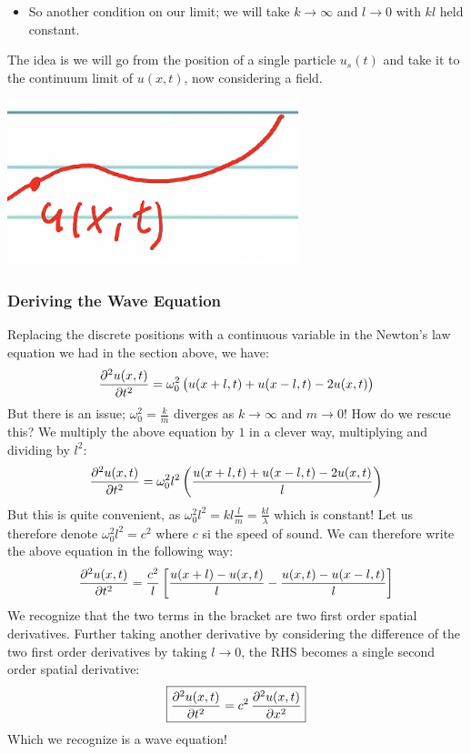 \documentclass[../PHYS306Notes.tex]{subfiles}
\begin{document}
\begin{itemize}
    \item So another condition on our limit; we will take $k \rightarrow \infty$ and $l \rightarrow 0$ with $kl$ held constant.
\end{itemize}
The idea is we will go from the position of a single particle $u_s(t)$ and take it to the continuum limit of $u(x, t)$, now considering a field.
\begin{center}
    \includegraphics[scale=1]{Lecture-30/l30-img2.png}
\end{center}

\subsubsection{Deriving the Wave Equation}
Replacing the discrete positions with a continuous variable in the Newton's law equation we had in the section above, we have:
\[\dpd[2]{u(x, t)}{t} = \omega_0^2\left(u(x + l, t) + u(x - l, t) - 2u(x, t)\right)\]
But there is an issue; $\omega_0^2 = \frac{k}{m}$ diverges as $k \rightarrow \infty$ and $m \rightarrow 0$! How do we rescue this? We multiply the above equation by $1$ in a clever way, multiplying and dividing by $l^2$:
\[\dpd[2]{u(x, t)}{t} = \omega_0^2l^2\left(\frac{u(x + l, t) + u(x - l, t) - 2u(x, t)}{l}\right)\]
But this is quite convenient, as $\omega_0^2l^2 = kl\frac{l}{m} = \frac{kl}{\lambda}$ which is constant! Let us therefore denote $\omega_0^2l^2 = c^2$ where $c$ si the speed of sound. We can therefore write the above equation in the following way:
\[\dpd[2]{u(x, t)}{t} = \frac{c^2}{l}\left[\frac{u(x +l) - u(x, t)}{l} - \frac{u(x, t) - u(x - l, t)}{l}\right]\]
We recognize that the two terms in the bracket are two first order spatial derivatives. Further taking another derivative by considering the difference of the two first order derivatives by taking $l \rightarrow 0$, the RHS becomes a single second order spatial derivative:
\[\boxed{\dpd[2]{u(x, t)}{t} = c^2\dpd[2]{u(x, t)}{x}}\]
Which we recognize is a wave equation!
\end{document}
